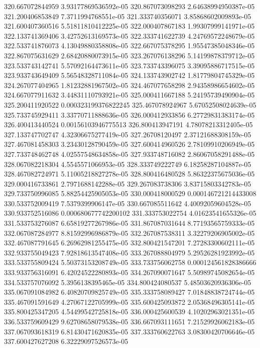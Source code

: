 {320.667072844959 3.93177869536592e-05
320.867073098293 2.64638994950387e-05
321.200406853849 7.3711994768551e-05
321.333740356071 3.85868602009893e-05
321.600407360516 5.51811810412225e-05
322.000407867183 1.99307999141971e-05
322.133741369406 3.42752613169573e-05
322.333741622739 4.24769572248679e-05
322.533741876073 4.13049880358808e-05
322.667075378295 1.95547385048346e-05
322.867075631629 2.68420880073915e-05
323.267076138296 5.14199878379712e-05
323.533743142741 5.57092164473611e-05
323.733743396075 3.39095886717515e-05
323.933743649409 5.56548328711084e-05
324.133743902742 1.81779804745329e-05
324.267077404965 1.81232881967502e-05
324.467077658298 2.94358986654602e-05
324.667077911632 3.44831110793921e-05
325.000411667188 5.24195739490904e-05
325.200411920522 0.000323199376822245
325.467078924967 5.67052508024639e-05
325.733745929411 3.33770711888636e-05
326.000412933856 6.27729831383174e-05
326.400413440524 0.00156103946775513
326.800413947191 4.78078213312405e-05
327.133747702747 4.32306675277419e-05
327.26708120497 2.37121688308159e-05
327.467081458303 3.23430128790459e-05
327.600414960526 2.78109910206949e-05
327.733748462748 4.02557548634858e-05
327.933748716082 2.86067058291488e-05
328.067082218304 4.5545571066953e-05
328.333749222749 6.18258287104887e-05
328.467082724971 5.11005218827278e-05
328.800416480528 5.86322375675036e-05
329.000416733861 2.7971688142288e-05
329.267083738306 3.83715803342783e-05
329.733750996085 5.88254425905053e-05
330.000418000529 0.000146721214433008
330.533752009419 7.5379399906147e-05
330.667085511642 4.40092059604528e-05
330.933752516086 0.000680677742200102
331.333753022754 4.01623541655326e-05
331.533753276087 6.65819277267986e-05
331.867087031644 8.77193565759333e-05
332.067087284977 8.81592996986879e-05
332.267087538311 3.32279206905002e-05
332.467087791645 6.26962981255475e-05
332.800421547201 7.27283300602111e-05
332.933755049423 7.92818613547408e-05
333.267088804979 5.29526281923992e-05
333.533755809424 5.50373153208749e-05
333.733756062758 0.000124561828386666
333.933756316091 6.42024522280893e-05
334.267090071647 5.50989745082654e-05
334.533757076092 5.3956138395465e-05
334.800424080537 5.48503620936306e-05
335.067091084982 6.40820709825749e-05
335.333758089427 7.01848838724744e-05
335.467091591649 4.27067122705999e-05
335.600425093872 2.05368496305141e-05
335.800425347205 4.54499542725818e-05
336.000425600539 4.10202963021351e-05
336.533759609429 9.62708658079538e-05
336.667093111651 7.21529926062183e-05
337.067093618319 6.81430471620835e-05
337.333760622763 3.08300420706646e-05
337.600427627208 6.32229097526573e-05
}
